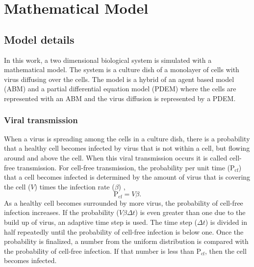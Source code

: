 \section{Mathematical Model}
\subsection{Model details} 

In this work, a two dimensional biological system is simulated with a mathematical model. The system is a culture dish of a monolayer of cells with virus diffusing over the cells. The model is a hybrid of an agent based model (ABM) and a partial differential equation model (PDEM) where the cells are represented with an ABM and the virus diffusion is represented by a PDEM.

\subsubsection{Viral transmission} \label{Viral_transmission}

When a virus is spreading among the cells in a culture dish, there is a probability that a healthy cell becomes infected by virus that is not within a cell, but flowing around and above the cell. When this viral transmission occurs it is called cell-free transmission. For cell-free transmission, the probability per unit time ($\mathrm{P_{cf}}$) that a cell becomes infected is determined by the amount of virus that is covering the cell ($V$) times the infection rate ($\beta$) \cite{holder11autoimm}, 
$$\mathrm{P_{cf}} = V \beta.$$ 
As a healthy cell becomes surrounded by more virus, the probability of cell-free infection increases. If the probability ($V \beta \Delta t$) is even greater than one due to the build up of virus, an adaptive time step is used. The time step ($\Delta t$) is divided in half repeatedly until the probability of cell-free infection is below one. Once the probability is finalized, a number from the uniform distribution is compared with the probability of cell-free infection. If that number is less than $\mathrm{P_{cf}}$, then the cell becomes infected.


